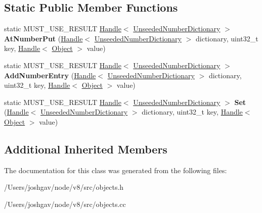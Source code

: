 \subsection*{Static Public Member Functions}
\begin{DoxyCompactItemize}
\item 
static M\+U\+S\+T\+\_\+\+U\+S\+E\+\_\+\+R\+E\+S\+U\+LT \hyperlink{classv8_1_1internal_1_1_handle}{Handle}$<$ \hyperlink{classv8_1_1internal_1_1_unseeded_number_dictionary}{Unseeded\+Number\+Dictionary} $>$ {\bfseries At\+Number\+Put} (\hyperlink{classv8_1_1internal_1_1_handle}{Handle}$<$ \hyperlink{classv8_1_1internal_1_1_unseeded_number_dictionary}{Unseeded\+Number\+Dictionary} $>$ dictionary, uint32\+\_\+t key, \hyperlink{classv8_1_1internal_1_1_handle}{Handle}$<$ \hyperlink{classv8_1_1internal_1_1_object}{Object} $>$ value)\hypertarget{classv8_1_1internal_1_1_unseeded_number_dictionary_acc70a12d0ce5e57e1b99048a1ecc7cbf}{}\label{classv8_1_1internal_1_1_unseeded_number_dictionary_acc70a12d0ce5e57e1b99048a1ecc7cbf}

\item 
static M\+U\+S\+T\+\_\+\+U\+S\+E\+\_\+\+R\+E\+S\+U\+LT \hyperlink{classv8_1_1internal_1_1_handle}{Handle}$<$ \hyperlink{classv8_1_1internal_1_1_unseeded_number_dictionary}{Unseeded\+Number\+Dictionary} $>$ {\bfseries Add\+Number\+Entry} (\hyperlink{classv8_1_1internal_1_1_handle}{Handle}$<$ \hyperlink{classv8_1_1internal_1_1_unseeded_number_dictionary}{Unseeded\+Number\+Dictionary} $>$ dictionary, uint32\+\_\+t key, \hyperlink{classv8_1_1internal_1_1_handle}{Handle}$<$ \hyperlink{classv8_1_1internal_1_1_object}{Object} $>$ value)\hypertarget{classv8_1_1internal_1_1_unseeded_number_dictionary_ae5727cfdee65439d364efdee1b3a241a}{}\label{classv8_1_1internal_1_1_unseeded_number_dictionary_ae5727cfdee65439d364efdee1b3a241a}

\item 
static M\+U\+S\+T\+\_\+\+U\+S\+E\+\_\+\+R\+E\+S\+U\+LT \hyperlink{classv8_1_1internal_1_1_handle}{Handle}$<$ \hyperlink{classv8_1_1internal_1_1_unseeded_number_dictionary}{Unseeded\+Number\+Dictionary} $>$ {\bfseries Set} (\hyperlink{classv8_1_1internal_1_1_handle}{Handle}$<$ \hyperlink{classv8_1_1internal_1_1_unseeded_number_dictionary}{Unseeded\+Number\+Dictionary} $>$ dictionary, uint32\+\_\+t key, \hyperlink{classv8_1_1internal_1_1_handle}{Handle}$<$ \hyperlink{classv8_1_1internal_1_1_object}{Object} $>$ value)\hypertarget{classv8_1_1internal_1_1_unseeded_number_dictionary_ab7825649681ca2f45dd49c9e5687cc99}{}\label{classv8_1_1internal_1_1_unseeded_number_dictionary_ab7825649681ca2f45dd49c9e5687cc99}

\end{DoxyCompactItemize}
\subsection*{Additional Inherited Members}


The documentation for this class was generated from the following files\+:\begin{DoxyCompactItemize}
\item 
/\+Users/joshgav/node/v8/src/objects.\+h\item 
/\+Users/joshgav/node/v8/src/objects.\+cc\end{DoxyCompactItemize}
